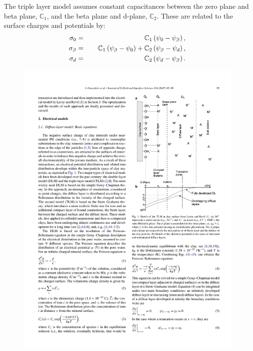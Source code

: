 \begin{enumerate}
\begin{enumerate}
The triple layer model assumes constant capacitances between the zero
plane and beta plane, $\mathbb{C}_1$, and the beta plane and d-plane, $\mathbb{C}_2$.
These are related to the surface charges and potentials by:
\begin{eqnarray}
  \sigma_0 &=& \mathbb{C}_1 \left( \psi_0 - \psi_{\beta} \right), \\
  \sigma_{\beta} &=& \mathbb{C}_1 \left( \psi_{\beta} - \psi_0 \right) + \mathbb{C}_2 \left( \psi_{\beta} - \psi_d \right),\\
  \sigma_{d} &=& \hspace{28mm}\mathbb{C}_2 \left( \psi_d - \psi_{\beta} \right).
\end{eqnarray}

\begin{figure}
  \begin{center}
    \includegraphics[width=0.75\linewidth]
                    {figs/sorption/goncalves-2007-TLM-Fig-a.pdf}
    \\[24pt]

\end{center}
\end{figure}
\end{enumerate}
\end{enumerate}
